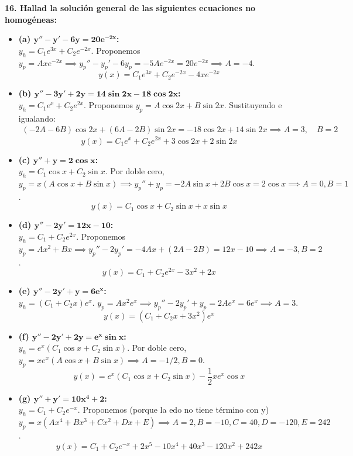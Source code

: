 \documentclass[11pt, a4paper]{article}
\begin{document}
\noindent\textbf{16. Hallad la solución general de las siguientes ecuaciones no homogéneas:}

\begin{itemize}
\item \textbf{(a) $\bm{y''-y'-6y=20e^{-2x}}$:} \\
$y_h = C_1 e^{3x} + C_2 e^{-2x}$. Proponemos $y_p = A x e^{-2x} \implies y_p'' - y_p' - 6y_p = -5A e^{-2x} = 20e^{-2x} \implies A = -4$.
\[
\boxed{y(x) = C_1 e^{3x} + C_2 e^{-2x} - 4x e^{-2x}}
\]

\item \textbf{(b) $\bm{y''-3y'+2y=14\sin 2x - 18\cos 2x}$:} \\
$y_h = C_1 e^x + C_2 e^{2x}$. Proponemos $y_p = A\cos 2x + B\sin 2x$. Sustituyendo e igualando:
\begin{align*}
(-2A - 6B)\cos 2x + (6A - 2B)\sin 2x = -18\cos 2x + 14\sin 2x \implies A = 3, \quad B = 2
\end{align*}
\[
\boxed{y(x) = C_1 e^x + C_2 e^{2x} + 3\cos 2x + 2\sin 2x}
\]

\item \textbf{(c) $\bm{y''+y=2\cos x}$:} \\
$y_h = C_1 \cos x + C_2 \sin x$. Por doble cero, $y_p = x(A\cos x + B\sin x) \implies y_p'' + y_p = -2A\sin x + 2B\cos x = 2\cos x \implies A = 0, B = 1$.
\[
\boxed{y(x) = C_1 \cos x + C_2 \sin x + x \sin x}
\]

\item \textbf{(d) $\bm{y''-2y'=12x-10}$:} \\
$y_h = C_1 + C_2 e^{2x}$. Proponemos $y_p = Ax^2 + Bx \implies y_p'' - 2y_p' = -4Ax + (2A - 2B) = 12x - 10 \implies A = -3, B = 2$.
\[
\boxed{y(x) = C_1 + C_2 e^{2x} - 3x^2 + 2x}
\]

\item \textbf{(e) $\bm{y''-2y'+y=6e^x}$:} \\
$y_h = (C_1 + C_2 x)e^x$. $y_p = A x^2 e^x \implies y_p'' - 2y_p' + y_p = 2A e^x = 6e^x \implies A = 3$.
\[
\boxed{y(x) = (C_1 + C_2 x + 3x^2)e^x}
\]

\item \textbf{(f) $\bm{y''-2y'+2y=e^x \sin x}$:} \\
$y_h = e^x(C_1 \cos x + C_2 \sin x)$. Por doble cero, $y_p = x e^x (A\cos x + B\sin x) \implies A = -1/2, B = 0$.
\[
\boxed{y(x) = e^x(C_1 \cos x + C_2 \sin x) - \frac{1}{2}x e^x \cos x}
\]

\item \textbf{(g) $\bm{y''+y'=10x^4+2}$:} \\
$y_h = C_1 + C_2 e^{-x}$. Proponemos (porque la edo no tiene término con y) $y_p = x(Ax^4 + Bx^3 + Cx^2 + Dx + E)   \implies A=2, B=-10, C=40, D=-120, E=242$.
\[
\boxed{y(x) = C_1 + C_2 e^{-x} + 2x^5 - 10x^4 + 40x^3 - 120x^2 + 242x}
\]


\end{itemize}
\end{document}
